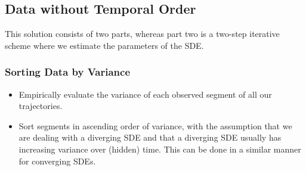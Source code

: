 \documentclass[a4paper, 11pt]{article}
\begin{document}
\begin{sloppypar}
\subsection{Data without Temporal Order}
This solution consists of two parts, whereas part two is a two-step iterative scheme where
we estimate the parameters of the SDE.
\subsubsection{Sorting Data by Variance}
\begin{itemize}
  \item Empirically evaluate the variance of each observed segment of all
  our trajectories.
  \item Sort segments in ascending order of variance, with the assumption that we
  are dealing with a diverging SDE and that a diverging SDE usually has increasing
  variance over (hidden) time. This can be done in a similar manner for converging SDEs.
\end{itemize}


\end{sloppypar}
\end{document}
